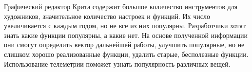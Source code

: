 \Introduction

Графический редактор Крита содержит большое количество инструментов для художников, значительное количество настроек и функций. Их число увеличивается с каждым годом, но не все из них популярны. Разработчики хотят знать какие функции популярны, а какие нет. На основе полученной информации они смогут определить вектор дальнейшей работы, улучшить популярные, но не слишком хорошо реализованные функции, удалить старые, бесполезные функции. Использование телеметрии поможет узнать популярность различных вещей.

